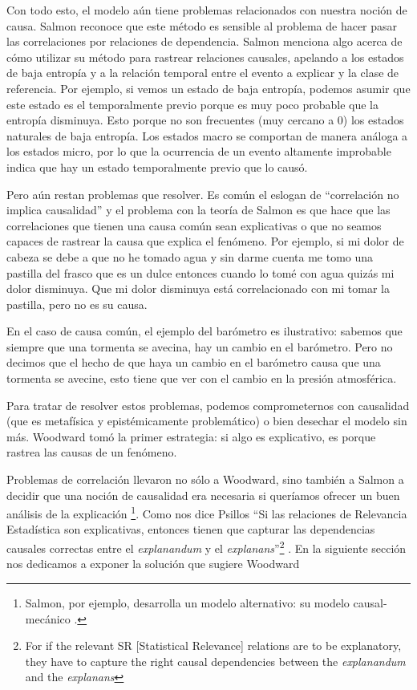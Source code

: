 Con todo esto, el modelo aún tiene problemas relacionados con nuestra noción de causa. Salmon reconoce que este método es sensible al problema de hacer pasar las correlaciones por relaciones de dependencia. Salmon menciona algo acerca de cómo utilizar su método para rastrear relaciones causales, apelando a los estados de baja entropía y a la relación temporal entre el evento a explicar y la clase de referencia. Por ejemplo, si vemos un estado de baja entropía, podemos asumir que este estado es el temporalmente previo porque es muy poco probable que la entropía disminuya. Esto porque no son frecuentes (muy cercano a 0) los estados naturales de baja entropía. Los estados macro se comportan de manera análoga a los estados micro, por lo que la ocurrencia de un evento altamente improbable indica que hay un estado temporalmente previo que lo causó.

Pero aún restan problemas que resolver. Es común el eslogan de ``correlación no implica causalidad'' y el problema con la teoría de Salmon es que hace que las correlaciones que tienen una causa común sean explicativas o que no seamos capaces de rastrear la causa que explica el fenómeno. Por ejemplo, si mi dolor de cabeza se debe a que no he tomado agua y sin darme cuenta me tomo una pastilla del frasco que es un dulce entonces cuando lo tomé con agua quizás mi dolor disminuya. Que mi dolor disminuya está correlacionado con mi tomar la pastilla, pero no es su causa.

En el caso de causa común, el ejemplo del barómetro es ilustrativo: sabemos que siempre que una tormenta se avecina, hay un cambio en el barómetro. Pero no decimos que el hecho de que haya un cambio en el barómetro causa que una tormenta se avecine, esto tiene que ver con el cambio en la presión atmosférica.

Para tratar de resolver estos problemas, podemos comprometernos con causalidad (que es metafísica y epistémicamente problemático) o bien desechar el modelo sin más. Woodward tomó la primer estrategia: si algo es explicativo, es porque rastrea las causas de un fenómeno.

Problemas de correlación llevaron no sólo a Woodward, sino también a Salmon a decidir que una noción de causalidad era necesaria si queríamos ofrecer un buen análisis de la explicación \footnote{Salmon, por ejemplo, desarrolla un modelo alternativo: su modelo causal-mecánico \cite{Salmon1994}.}. Como nos dice Psillos ``Si las relaciones de Relevancia Estadística son explicativas, entonces tienen que capturar las dependencias causales correctas entre el \textit{explanandum} y el \textit{explanans}''\footnote{For if the relevant SR [Statistical Relevance] relations are to be explanatory, they have to capture the right causal dependencies between the \textit{explanandum} and the \textit{explanans}} \cite[p. 255]{Psillos2009}. En la siguiente sección nos dedicamos a exponer la solución que sugiere Woodward


